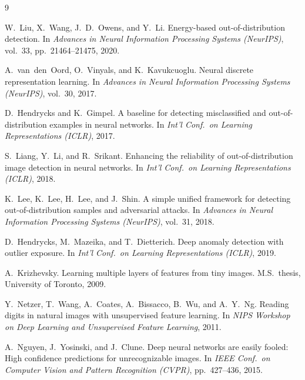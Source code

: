 \documentclass[10pt,twocolumn,letterpaper]{article}
\begin{document}
\clearpage
{\small
\begin{thebibliography}{9}

W.~Liu, X.~Wang, J.~D.~Owens, and Y.~Li.
\newblock Energy-based out-of-distribution detection.
\newblock In {\em Advances in Neural Information Processing
  Systems (NeurIPS)}, vol.~33, pp.~21464--21475, 2020.

A.~van~den~Oord, O.~Vinyals, and K.~Kavukcuoglu.
\newblock Neural discrete representation learning.
\newblock In {\em Advances in Neural Information Processing
  Systems (NeurIPS)}, vol.~30, 2017.

D.~Hendrycks and K.~Gimpel.
\newblock A baseline for detecting misclassified and
  out-of-distribution examples in neural networks.
\newblock In {\em Int'l Conf.\ on Learning Representations
  (ICLR)}, 2017.

S.~Liang, Y.~Li, and R.~Srikant.
\newblock Enhancing the reliability of out-of-distribution
  image detection in neural networks.
\newblock In {\em Int'l Conf.\ on Learning Representations
  (ICLR)}, 2018.

K.~Lee, K.~Lee, H.~Lee, and J.~Shin.
\newblock A simple unified framework for detecting
  out-of-distribution samples and adversarial attacks.
\newblock In {\em Advances in Neural Information Processing
  Systems (NeurIPS)}, vol.~31, 2018.

D.~Hendrycks, M.~Mazeika, and T.~Dietterich.
\newblock Deep anomaly detection with outlier exposure.
\newblock In {\em Int'l Conf.\ on Learning Representations
  (ICLR)}, 2019.

A.~Krizhevsky.
\newblock Learning multiple layers of features from tiny
  images.
\newblock M.S.\ thesis, University of Toronto, 2009.

Y.~Netzer, T.~Wang, A.~Coates, A.~Bissacco, B.~Wu, and
  A.~Y.~Ng.
\newblock Reading digits in natural images with unsupervised
  feature learning.
\newblock In {\em NIPS Workshop on Deep Learning and
  Unsupervised Feature Learning}, 2011.

A.~Nguyen, J.~Yosinski, and J.~Clune.
\newblock Deep neural networks are easily fooled: High
  confidence predictions for unrecognizable images.
\newblock In {\em IEEE Conf.\ on Computer Vision and Pattern
  Recognition (CVPR)}, pp.~427--436, 2015.

\end{thebibliography}
}
\end{document}
